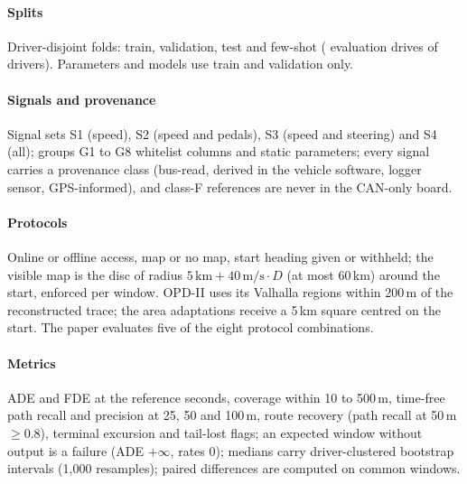 \documentclass[conference]{IEEEtran}
\begin{document}
\paragraph{Splits} Driver-disjoint folds: train, validation, test and few-shot (\NHeldoutDrives{} evaluation drives
of \NHeldoutDrivers{} drivers). Parameters and models use train and validation only.
\paragraph{Signals and provenance} Signal sets S1 (speed), S2 (speed and pedals), S3 (speed and steering) and S4 (all);
groups G1 to G8 whitelist columns and static parameters; every signal carries a provenance class (bus-read, derived in
the vehicle software, logger sensor, GPS-informed), and class-F references are never in the CAN-only board.
\paragraph{Protocols} Online or offline access, map or no map, start heading given or withheld; the visible map is the
disc of radius $5\,\mathrm{km} + 40\,\mathrm{m/s} \cdot D$ (at most 60\,km) around the start, enforced per window. OPD-II uses its Valhalla regions within 200\,m of the reconstructed trace; the area adaptations receive a 5\,km square centred on the start. The paper evaluates five of the eight protocol combinations.
\paragraph{Metrics} ADE and FDE at the reference seconds, coverage within 10 to 500\,m, time-free path recall and
precision at 25, 50 and 100\,m, route recovery (path recall at 50\,m $\ge 0.8$), terminal excursion and tail-lost
flags; an expected window without output is a failure (ADE $+\infty$, rates 0); medians carry driver-clustered
bootstrap intervals (1{,}000 resamples); paired differences are computed on common windows.
\end{document}
